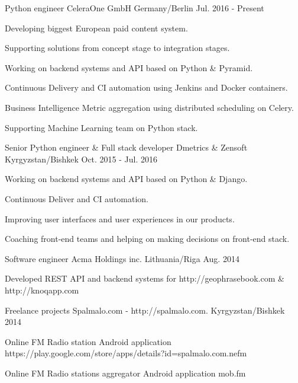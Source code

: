 \begin{cventries}
  \cventry
    {Python engineer}
    {CeleraOne GmbH}
    {Germany/Berlin}
    {Jul. 2016 - Present}
    {
      \begin{cvitems}
        \item {Developing biggest European paid content system.}
        \item {Supporting solutions from concept stage to integration stages.}
        \item {Working on backend systems and API based on Python \& Pyramid.}
        \item {Continuous Delivery and CI automation using Jenkins and Docker containers.}
        \item {Business Intelligence Metric aggregation using distributed scheduling on Celery.}
        \item {Supporting Machine Learning team on Python stack.}
      \end{cvitems}
    }
  \cventry
    {Senior Python engineer \& Full stack developer}
    {Dmetrics \& Zensoft}
    {Kyrgyzstan/Bishkek}
    {Oct. 2015 - Jul. 2016}
    {
      \begin{cvitems}
        \item {Working on backend systems and API based on Python \& Django.}
        \item {Continuous Deliver and CI automation.}
        \item {Improving user interfaces and user experiences in our products.}
        \item {Coaching front-end teams and helping on making decisions on front-end stack.}
      \end{cvitems}
    }
  \cventry
    {Software engineer}
    {Acma Holdings inc.}
    {Lithuania/Riga}
    {Aug. 2014}
    {
      \begin{cvitems}
        \item {Developed REST API and backend systems for http://geophrasebook.com \& http://knoqapp.com}
      \end{cvitems}
    }
  \cventry
    {Freelance projects}
    {Spalmalo.com - http://spalmalo.com.}
    {Kyrgyzstan/Bishkek}
    {2014}
    {
      \begin{cvitems}
        \item {Online FM Radio station Android application https://play.google.com/store/apps/details?id=spalmalo.com.nefm}
        \item {Online FM Radio stations aggregator Android application mob.fm}

\end{cvitems}}
\end{cventries}
